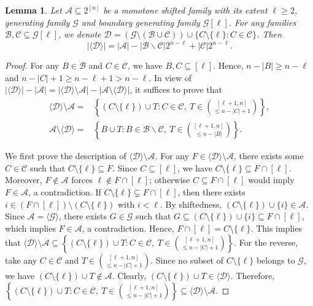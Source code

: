 \documentclass[11pt,a4paper]{article}
\newtheorem{lemma}[theorem]{Lemma}
\begin{document}
\begin{lemma}\label{le1}
Let $\mathcal{A}\subseteq 2^{[n]}$ be a monotone shifted family with its extent $\ell\geq  2$, generating family $\mathcal{G}$ and boundary generating family $\mathcal{G}[\ell]$.  For any families $\mathcal{B}, \mathcal{C}\subseteq \mathcal{G}[\ell]$, we denote $\mathcal{D}=(\mathcal{G}\setminus(\mathcal{B}\cup\mathcal{C}))\cup\{C\setminus\{\ell\}: C\in\mathcal{C}\}$. Then
$$
{ |\langle\mathcal{D}\rangle|=|\mathcal{A}|-|\mathcal{B}\backslash\mathcal{C}|2^{n-\ell}+|\mathcal{C}|2^{n-\ell}.}
$$
\end{lemma}
\begin{proof}
For any $B\in \mathcal{B}$ and $C\in \mathcal{C}$, we have
 $B, C \subseteq [\ell]$. Hence,   $n-|B| \ge n-\ell$ and $n-|C|+1 \ge n-\ell+1 > n-\ell$.
In view of $|\langle\mathcal{D}\rangle|-|\mathcal{A}|=|\langle\mathcal{D}\rangle\setminus\mathcal{A}|-|\mathcal{A}\setminus\langle\mathcal{D}\rangle|$, 
it suffices to prove that
\begin{align*}
\langle\mathcal{D}\rangle\setminus\mathcal{A}=&\left\{(C\setminus\{\ell\})\cup T: C\in\mathcal{C},\ T\in\binom{[\ell+1,n]}{\leq n-|C|+1}\right\},\\
\mathcal{A}\setminus\langle\mathcal{D}\rangle=&\left\{B\cup T: B\in\mathcal{B}\backslash \mathcal{C},\ T\in\binom{[\ell+1,n]}{\leq n-|B|}\right\}.
 \end{align*}

We first prove the description of $\langle\mathcal{D}\rangle\setminus\mathcal{A}$.
For any $F\in\langle\mathcal{D}\rangle\setminus\mathcal{A}$, there exists some $C\in\mathcal{C}$ such that $C\setminus\{\ell\}\subseteq F$.  Since $C\subseteq [\ell]$, we have $C\setminus\{\ell\}\subseteq F\cap[\ell]$.
Moreover, $F\notin\mathcal{A}$  forces  $\ell \notin F\cap[\ell]$; otherwise $C\subseteq F\cap[\ell]$ would imply $F\in\mathcal{A}$, a contradiction.
If $C\setminus\{\ell\}\subsetneq F\cap[\ell]$, then there exists $i\in(F\cap[\ell])\setminus(C\setminus\{\ell\})$ with $i<\ell$. By shiftedness, $(C\setminus\{\ell\})\cup\{i\}\in\mathcal{A}$. Since 
$\mathcal{A}= \langle\mathcal{G}\rangle$, there exists $G\in\mathcal{G}$ such that $G\subseteq(C\setminus\{\ell\})\cup\{i\}\subseteq F\cap[\ell]$, which implies  $F\in\mathcal{A}$, a contradiction. 
Hence, $F\cap[\ell]=C\setminus\{\ell\}$. This implies that
$\langle\mathcal{D}\rangle\setminus\mathcal{A}\subseteq\left\{(C\setminus\{\ell\})\cup T: C\in\mathcal{C},\ T\in\binom{[\ell+1,n]}{\leq n-|C|+1}\right\}.$  
For the reverse, take any  $C\in\mathcal{C}$ and $ T\in\binom{[\ell+1,n]}{\leq n-|C|+1}$.
Since no subset of $C\setminus\{\ell\}$ belongs to $\mathcal{G}$,
 we have $(C\setminus\{\ell\})\cup T \notin \mathcal{A}$. Clearly, $(C\setminus\{\ell\})\cup T \in \langle\mathcal{D}\rangle$. 
Therefore, 
$\left\{(C\setminus\{\ell\})\cup T: C\in\mathcal{C},\ T\in\binom{[\ell+1,n]}{\leq n-|C|+1}\right\} \subseteq\langle\mathcal{D}\rangle\setminus\mathcal{A}$.




\end{proof}
\end{document}
